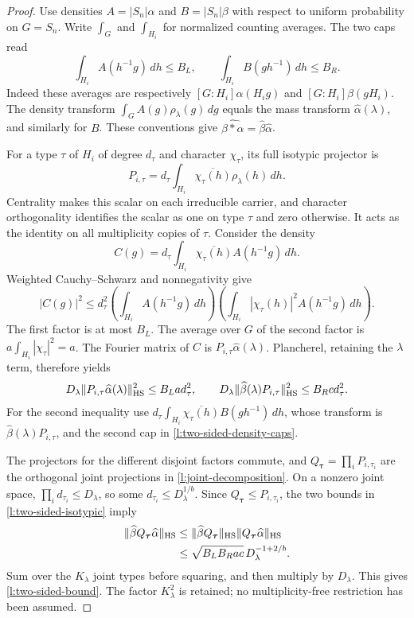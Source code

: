 \begin{proof}
Use densities $A=|S_n|\alpha$ and $B=|S_n|\beta$ with respect
to uniform probability on $G=S_n$.  Write $\int_G$ and
$\int_{H_i}$ for normalized counting averages.  The two caps read
\begin{equation}\label{l:two-sided-density-caps}
 \int_{H_i}A(h^{-1}g)\,dh\le B_L,
 \qquad
 \int_{H_i}B(gh^{-1})\,dh\le B_R.
\end{equation}
Indeed these averages are respectively
$[G:H_i]\alpha(H_i g)$ and $[G:H_i]\beta(gH_i)$.
The density transform $\int_G A(g)\rho_\lambda(g)\,dg$ equals
the mass transform $\widehat\alpha(\lambda)$, and similarly for
$B$.  These conventions give
$\widehat{\beta*\alpha}=\widehat\beta\widehat\alpha$.

For a type $\tau$ of $H_i$ of degree $d_\tau$ and character
$\chi_\tau$, its full isotypic projector is
\[
 P_{i,\tau}=d_\tau\int_{H_i}
              \overline{\chi_\tau(h)}\rho_\lambda(h)\,dh.
\]
Centrality makes this scalar on each irreducible carrier, and
character orthogonality identifies the scalar as one on type $\tau$
and zero otherwise.  It acts as the identity on all multiplicity
copies of $\tau$.
Consider the density
\[
 C(g)=d_\tau\int_{H_i}\overline{\chi_\tau(h)}A(h^{-1}g)\,dh.
\]
Weighted Cauchy--Schwarz and nonnegativity give
\[
 |C(g)|^2\le d_\tau^2
  \left(\int_{H_i}A(h^{-1}g)\,dh\right)
  \left(\int_{H_i}|\chi_\tau(h)|^2A(h^{-1}g)\,dh\right).
\]
The first factor is at most $B_L$.  The average over $G$ of the
second factor is $a\int_{H_i}|\chi_\tau|^2=a$.
The Fourier matrix of $C$ is
$P_{i,\tau}\widehat\alpha(\lambda)$.
Plancherel, retaining the $\lambda$ term, therefore yields
\begin{equation}\label{l:two-sided-isotypic}
 D_\lambda\|P_{i,\tau}\widehat\alpha(\lambda)\|_{\mathrm{HS}}^2
       \le B_La d_\tau^2,
 \qquad
 D_\lambda\|\widehat\beta(\lambda)P_{i,\tau}\|_{\mathrm{HS}}^2
       \le B_Rc d_\tau^2.
\end{equation}
For the second inequality use
$d_\tau\int_{H_i}\overline{\chi_\tau(h)}B(gh^{-1})\,dh$,
whose transform is $\widehat\beta(\lambda)P_{i,\tau}$, and the
second cap in \eqref{l:two-sided-density-caps}.

The projectors for the different disjoint factors commute, and
$Q_{\boldsymbol\tau}=\prod_iP_{i,\tau_i}$ are the orthogonal
joint projections in \eqref{l:joint-decomposition}.  On a nonzero
joint space, $\prod_i d_{\tau_i}\le D_\lambda$, so some
$d_{\tau_i}\le D_\lambda^{1/b}$.
Since $Q_{\boldsymbol\tau}\le P_{i,\tau_i}$, the two bounds
in \eqref{l:two-sided-isotypic} imply
\[
 \begin{split}
 \|\widehat\beta Q_{\boldsymbol\tau}\widehat\alpha\|_{\mathrm{HS}}
 &\le\|\widehat\beta Q_{\boldsymbol\tau}\|_{\mathrm{HS}}
             \|Q_{\boldsymbol\tau}\widehat\alpha\|_{\mathrm{HS}}\\
 &\le\sqrt{B_LB_Rac}\,D_\lambda^{-1+2/b}.
 \end{split}
\]
Sum over the $K_\lambda$ joint types before squaring, and then
multiply by $D_\lambda$.  This gives
\eqref{l:two-sided-bound}.  The factor $K_\lambda^2$ is retained;
no multiplicity-free restriction has been assumed.
\end{proof}


